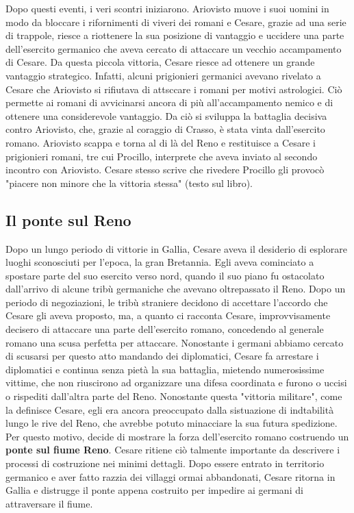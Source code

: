 \documentclass[10pt,a4paper]{article}
\begin{document}
	Dopo questi eventi, i veri scontri iniziarono. Ariovisto muove i suoi uomini in modo da bloccare i rifornimenti di viveri dei romani e Cesare, grazie ad una serie di trappole, riesce a riottenere la sua posizione di vantaggio e uccidere una parte dell'esercito germanico che aveva cercato di attaccare un vecchio accampamento di Cesare.
Da questa piccola vittoria, Cesare riesce ad ottenere un grande vantaggio strategico. Infatti, alcuni prigionieri germanici avevano rivelato a Cesare che Ariovisto si rifiutava di attsccare i romani per motivi astrologici. Ciò permette ai romani di avvicinarsi ancora di più all'accampamento nemico e di ottenere una considerevole vantaggio. Da ciò si sviluppa la battaglia decisiva contro Ariovisto, che, grazie al coraggio di Crasso, è stata vinta dall'esercito romano. Ariovisto scappa e torna al di là del Reno e restituisce a Cesare i prigionieri romani, tre cui Procillo, interprete che aveva inviato al secondo incontro con Ariovisto. Cesare stesso scrive che rivedere Procillo gli provocò "piacere non minore che la vittoria stessa" (testo sul libro).

\subsection{Il ponte sul Reno}

Dopo un lungo periodo di vittorie in Gallia, Cesare aveva il desiderio di esplorare luoghi sconosciuti per l'epoca, la gran Bretannia. Egli aveva cominciato a spostare parte del suo esercito verso nord, quando il suo piano fu ostacolato dall'arrivo di alcune tribù germaniche che avevano oltrepassato il Reno. Dopo un periodo di negoziazioni, le tribù straniere decidono di accettare l'accordo che Cesare gli aveva proposto, ma, a quanto ci racconta Cesare, improvvisamente decisero di attaccare una parte dell'esercito romano, concedendo al generale romano una scusa perfetta per attaccare. Nonostante i germani abbiamo cercato di scusarsi per questo atto mandando dei diplomatici, Cesare fa arrestare i diplomatici e continua senza pietà la sua battaglia, mietendo numerosissime vittime, che non riuscirono ad organizzare una difesa coordinata e furono o uccisi o rispediti dall'altra parte del Reno. Nonostante questa "vittoria militare", come la definisce Cesare, egli era ancora preoccupato dalla sistuazione di indtabilità lungo le rive del Reno, che avrebbe potuto minacciare la sua futura spedizione. Per questo motivo, decide di mostrare la forza dell'esercito romano costruendo un \textbf{ponte sul fiume Reno}. Cesare ritiene ciò talmente importante da descrivere i processi di costruzione nei minimi dettagli. Dopo essere entrato in territorio germanico e aver fatto razzia dei villaggi ormai abbandonati, Cesare ritorna in Gallia e distrugge il ponte appena costruito per impedire ai germani di attraversare il fiume.
\end{document}

